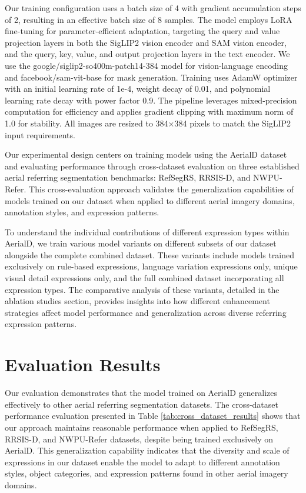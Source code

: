 Our training configuration uses a batch size of 4 with gradient accumulation steps of 2, resulting in an effective batch size of 8 samples. The model employs LoRA fine-tuning for parameter-efficient adaptation, targeting the query and value projection layers in both the SigLIP2 vision encoder and SAM vision encoder, and the query, key, value, and output projection layers in the text encoder. We use the google/siglip2-so400m-patch14-384 model for vision-language encoding and facebook/sam-vit-base for mask generation. Training uses AdamW optimizer with an initial learning rate of 1e-4, weight decay of 0.01, and polynomial learning rate decay with power factor 0.9. The pipeline leverages mixed-precision computation for efficiency and applies gradient clipping with maximum norm of 1.0 for stability. All images are resized to 384×384 pixels to match the SigLIP2 input requirements.

Our experimental design centers on training models using the AerialD dataset and evaluating performance through cross-dataset evaluation on three established aerial referring segmentation benchmarks: RefSegRS, RRSIS-D, and NWPU-Refer. This cross-evaluation approach validates the generalization capabilities of models trained on our dataset when applied to different aerial imagery domains, annotation styles, and expression patterns.

To understand the individual contributions of different expression types within AerialD, we train various model variants on different subsets of our dataset alongside the complete combined dataset. These variants include models trained exclusively on rule-based expressions, language variation expressions only, unique visual detail expressions only, and the full combined dataset incorporating all expression types. The comparative analysis of these variants, detailed in the ablation studies section, provides insights into how different enhancement strategies affect model performance and generalization across diverse referring expression patterns.


\section{Evaluation Results}

Our evaluation demonstrates that the model trained on AerialD generalizes effectively to other aerial referring segmentation datasets. The cross-dataset performance evaluation presented in Table \ref{tab:cross_dataset_results} shows that our approach maintains reasonable performance when applied to RefSegRS, RRSIS-D, and NWPU-Refer datasets, despite being trained exclusively on AerialD. This generalization capability indicates that the diversity and scale of expressions in our dataset enable the model to adapt to different annotation styles, object categories, and expression patterns found in other aerial imagery domains.

